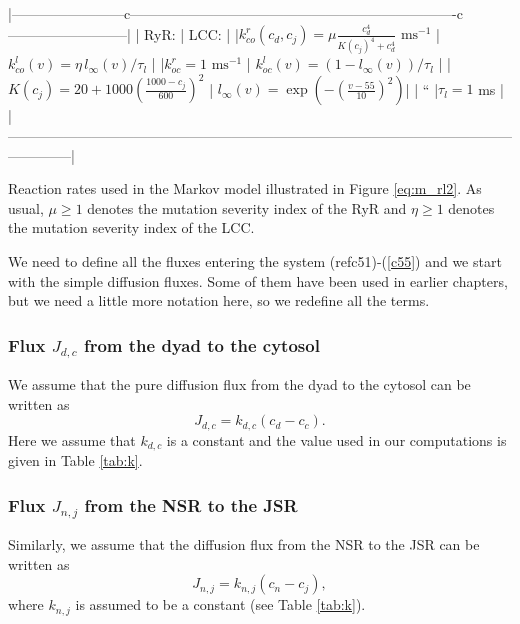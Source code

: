 |------------------------c----------------------------------------------------------------------c--------------------------|
| RyR:                                                                     | LCC:                                          |
|$k_{co}^{r}(c_d,c_j)=\mu \frac{c_d^4}{K(c_j)^4+c_d^4} \text{ ms}^{-1}$    | $k_{co}^{l}(v)=\eta\, l_{\infty}(v)/\tau_l$   |
|$k_{oc}^{r}=1 \text{ ms}^{-1}$                                            | $k_{oc}^{l}(v)=(1-l_{\infty}(v))/\tau_l$      |
|$K(c_j) = 20+1000(\frac{1000-c_j}{600})^2$                                |  $ l_{\infty}(v) = \exp(-(\frac{v-55}{10})^2)$|
|                                   ``                                     |$\tau_l=1$ ms                                  |
|--------------------------------------------------------------------------------------------------------------------------|

Reaction rates used in the Markov model illustrated in
Figure \ref{eq:m_rl2}.
As usual,  $\mu \ge 1$ denotes the mutation severity
index of the RyR and $\eta \ge 1$ denotes the mutation severity
index of the LCC.

We need to define all the fluxes entering the system (ref{c51})-(\ref{c55}) and we start with the simple diffusion fluxes. Some of
them have been used in earlier chapters, but we need a little more notation
here, so we redefine all the terms.

\subsubsection{Flux $J_{d,c}$ from the dyad to the cytosol}
We assume that the pure diffusion flux
from the dyad to the cytosol can be written as
\begin{equation}
J_{d,c}=k_{d,c}\left(  c_{d}-c_{c}\right).
 \label{J_dc}
\end{equation}
Here we assume that $k_{d,c}$ is a constant and the value used in our computations is given in Table \ref{tab:k}.

\subsubsection{Flux $J_{n,j}$ from the NSR to the JSR}
Similarly, we assume that the diffusion flux from the NSR to the JSR can be written as
\begin{equation}
J_{n,j}=k_{n,j}\left(  c_{n}-c_{j}\right), \label{J_nj}
\end{equation}
where $k_{n,j}$ is assumed to be a constant (see Table \ref{tab:k}).

